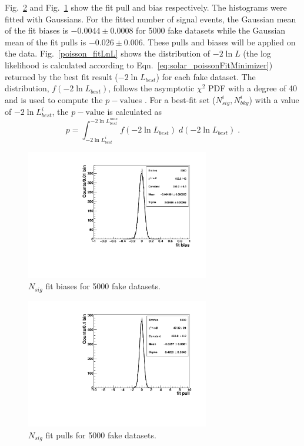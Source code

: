 Fig.~\ref{poisson_fitPull} and Fig.~\ref{poisson_fitBias} show the fit pull and bias respectively. The histograms were fitted with Gaussians. For the fitted number of signal events, the Gaussian mean of the fit biases is $-0.0044\pm0.0008$ for 5000 fake datasets while the Gaussian mean of the fit pulls is $-0.026\pm0.006$. These pulls and biases will be applied on the data. Fig.~\ref{poisson_fitLnL} shows the distribution of $-2\ln L$ (the log likelihood is calculated according to Eqn.~\ref{eq:solar_poissonFitMinimizer}) returned by the best fit result ($-2\ln L_{best}$) for each fake dataset. The distribution, $f({-2\ln L_{best}})$, follows the asymptotic $\chi^2$ PDF with a degree of 40 and is used to compute the $p-\mathrm{value}$s \cite{pdg2020}. For a best-fit set ($N^i_{sig},N^i_{bkg}$) with a value of $-2\ln L^i_{best}$, the $p-\mathrm{value}$ is calculated as
\begin{equation*}
p=\int_{-2\ln L^{i}_{best}}^{-2\ln L^{max}_{best}}f({-2\ln L_{best}}) \; d(-2\ln L_{best}) \; .
\end{equation*}


\begin{figure}[!htb]
	\centering
	\includegraphics[width=8cm]{ensemble_fitBias.pdf}
	\caption{$N_{sig}$ fit biases for 5000 fake datasets. \label{poisson_fitBias}}
\end{figure} 

\begin{figure}[!htb]
	\centering
	\includegraphics[width=8cm]{ensemble_fitPull.pdf}
	\caption{$N_{sig}$ fit pulls for 5000 fake datasets. \label{poisson_fitPull}}
\end{figure} 

